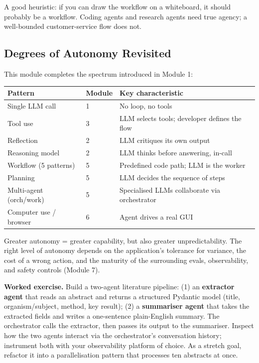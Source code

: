 \documentclass[a4paper,11pt]{article}
\begin{document}
A good heuristic: if you can draw the workflow on a whiteboard, it
should probably be a workflow. Coding agents and research agents
need true agency; a well-bounded customer-service flow does not.

\subsection{Degrees of Autonomy \textemdash{} Revisited}

This module completes the spectrum introduced in Module 1:

\begin{center}\small
\begin{tabular}{p{4cm} p{2.8cm} p{5.2cm}}
  \toprule
  \textbf{Pattern} & \textbf{Module} & \textbf{Key characteristic} \\
  \midrule
  Single LLM call         & 1 & No loop, no tools \\
  Tool use                & 3 & LLM selects tools; developer defines the flow \\
  Reflection              & 2 & LLM critiques its own output \\
  Reasoning model         & 2 & LLM thinks before answering, in-call \\
  Workflow (5 patterns)   & 5 & Predefined code path; LLM is the worker \\
  Planning                & 5 & LLM decides the sequence of steps \\
  Multi-agent (orch/work) & 5 & Specialised LLMs collaborate via orchestrator \\
  Computer use / browser  & 6 & Agent drives a real GUI \\
  \bottomrule
\end{tabular}
\end{center}

Greater autonomy = greater capability, but also greater
unpredictability. The right level of autonomy depends on the
application's tolerance for variance, the cost of a wrong action,
and the maturity of the surrounding evals, observability, and
safety controls (Module 7).

\begin{callout}
\textbf{Worked exercise.}
Build a two-agent literature pipeline:
(1) an \textbf{extractor agent} that reads an abstract and returns a
structured Pydantic model (title, organism/subject, method, key
result);
(2) a \textbf{summariser agent} that takes the extracted fields and
writes a one-sentence plain-English summary.
The orchestrator calls the extractor, then passes its output to the
summariser. Inspect how the two agents interact via the
orchestrator's conversation history; instrument both with your
observability platform of choice. As a stretch goal, refactor it
into a parallelisation pattern that processes ten abstracts at once.
\end{callout}
\end{document}

